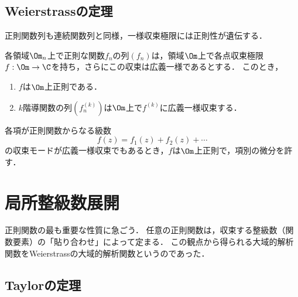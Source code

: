 \documentclass[uplatex, dvipdfmx]{jsreport}
\begin{document}
\subsection{Weierstrassの定理}

\begin{tcolorbox}[colframe=ForestGreen, colback=ForestGreen!10!white,breakable,colbacktitle=ForestGreen!40!white,coltitle=black,fonttitle=\bfseries\sffamily,
title=]
    正則関数列も連続関数列と同様，一様収束極限には正則性が遺伝する．
\end{tcolorbox}

\begin{theorem}[Weierstrass]\label{thm-Weierstrass-convergence-theorem}
    各領域$\Om_n$上で正則な関数$f_n$の列$(f_n)$は，領域$\Om$上で各点収束極限$f:\Om\to\C$を持ち，さらにこの収束は広義一様であるとする．
    このとき，
    \begin{enumerate}
        \item $f$は$\Om$上正則である．
        \item $k$階導関数の列$(f_n^{(k)})$は$\Om$上で$f^{(k)}$に広義一様収束する．
    \end{enumerate}
\end{theorem}

\begin{corollary}
    各項が正則関数からなる級数
    \[f(z)=f_1(z)+f_2(z)+\cdots\]
    の収束モードが広義一様収束でもあるとき，$f$は$\Om$上正則で，項別の微分を許す．
\end{corollary}

\section{局所整級数展開}

\begin{tcolorbox}[colframe=ForestGreen, colback=ForestGreen!10!white,breakable,colbacktitle=ForestGreen!40!white,coltitle=black,fonttitle=\bfseries\sffamily,
title=]
    正則関数の最も重要な性質に急ごう．
    任意の正則関数は，収束する整級数（関数要素）の「貼り合わせ」によって定まる．
    この観点から得られる大域的解析関数をWeierstrassの大域的解析関数というのであった．
\end{tcolorbox}

\subsection{Taylorの定理}
\end{document}
